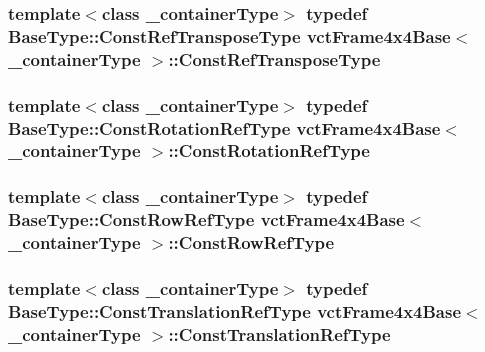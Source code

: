 \subsubsection[{Const\+Ref\+Transpose\+Type}]{\setlength{\rightskip}{0pt plus 5cm}template$<$class \+\_\+container\+Type$>$ typedef {\bf Base\+Type\+::\+Const\+Ref\+Transpose\+Type} {\bf vct\+Frame4x4\+Base}$<$ \+\_\+container\+Type $>$\+::{\bf Const\+Ref\+Transpose\+Type}}\label{classvct_frame4x4_base_a1f3226ad5b15ec1edb95cfe760eacc4f}
\hypertarget{classvct_frame4x4_base_a427cd6a2c5f48f68fde733a9b51a83e3}{}
\subsubsection[{Const\+Rotation\+Ref\+Type}]{\setlength{\rightskip}{0pt plus 5cm}template$<$class \+\_\+container\+Type$>$ typedef Base\+Type\+::\+Const\+Rotation\+Ref\+Type {\bf vct\+Frame4x4\+Base}$<$ \+\_\+container\+Type $>$\+::{\bf Const\+Rotation\+Ref\+Type}}\label{classvct_frame4x4_base_a427cd6a2c5f48f68fde733a9b51a83e3}
\hypertarget{classvct_frame4x4_base_a75f2ff66cb8cdd2322c576e7be0b94a1}{}
\subsubsection[{Const\+Row\+Ref\+Type}]{\setlength{\rightskip}{0pt plus 5cm}template$<$class \+\_\+container\+Type$>$ typedef {\bf Base\+Type\+::\+Const\+Row\+Ref\+Type} {\bf vct\+Frame4x4\+Base}$<$ \+\_\+container\+Type $>$\+::{\bf Const\+Row\+Ref\+Type}}\label{classvct_frame4x4_base_a75f2ff66cb8cdd2322c576e7be0b94a1}
\hypertarget{classvct_frame4x4_base_a720869bcd28db8ef2f9f13294097e99e}{}
\subsubsection[{Const\+Translation\+Ref\+Type}]{\setlength{\rightskip}{0pt plus 5cm}template$<$class \+\_\+container\+Type$>$ typedef Base\+Type\+::\+Const\+Translation\+Ref\+Type {\bf vct\+Frame4x4\+Base}$<$ \+\_\+container\+Type $>$\+::{\bf Const\+Translation\+Ref\+Type}}\label{classvct_frame4x4_base_a720869bcd28db8ef2f9f13294097e99e}
\hypertarget{classvct_frame4x4_base_a3ae00d9c053676770458dc28ad41cc5a}{}
